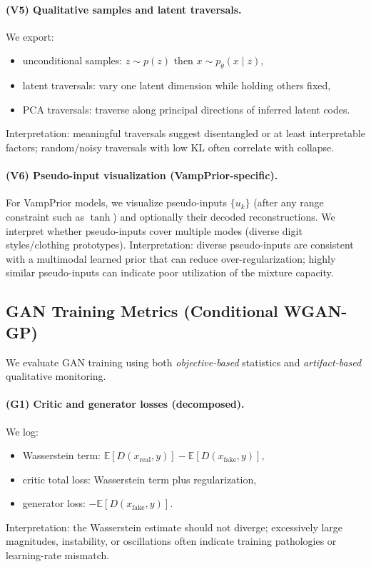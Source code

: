 \paragraph{(V5) Qualitative samples and latent traversals.}
We export:
\begin{itemize}
  \item unconditional samples: $z\sim p(z)$ then $x\sim p_\theta(x\mid z)$,
  \item latent traversals: vary one latent dimension while holding others fixed,
  \item PCA traversals: traverse along principal directions of inferred latent codes.
\end{itemize}
Interpretation: meaningful traversals suggest disentangled or at least interpretable factors; random/noisy traversals with low KL often correlate with collapse.

\paragraph{(V6) Pseudo-input visualization (VampPrior-specific).}
For VampPrior models, we visualize pseudo-inputs $\{u_k\}$ (after any range constraint such as $\tanh$) and optionally their decoded reconstructions. We interpret whether pseudo-inputs cover multiple modes (diverse digit styles/clothing prototypes).
Interpretation: diverse pseudo-inputs are consistent with a multimodal learned prior that can reduce over-regularization; highly similar pseudo-inputs can indicate poor utilization of the mixture capacity.

\subsection{GAN Training Metrics (Conditional WGAN-GP)}
We evaluate GAN training using both \emph{objective-based} statistics and \emph{artifact-based} qualitative monitoring.

\paragraph{(G1) Critic and generator losses (decomposed).}
We log:
\begin{itemize}
  \item Wasserstein term: $\mathbb{E}[D(x_{\mathrm{real}},y)]-\mathbb{E}[D(x_{\mathrm{fake}},y)]$,
  \item critic total loss: Wasserstein term plus regularization,
  \item generator loss: $-\mathbb{E}[D(x_{\mathrm{fake}},y)]$.
\end{itemize}
Interpretation: the Wasserstein estimate should not diverge; excessively large magnitudes, instability, or oscillations often indicate training pathologies or learning-rate mismatch.


